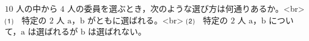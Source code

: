 $10$ 人の中から $4$ 人の委員を選ぶとき，次のような選び方は何通りあるか。<br>
⑴　特定の $2$ 人 $\mathrm{a}$，$\mathrm{b}$ がともに選ばれる。<br>
⑵　特定の $2$ 人 $\mathrm{a}$，$\mathrm{b}$ について，$\mathrm{a}$ は選ばれるが $\mathrm{b}$ は選ばれない。
